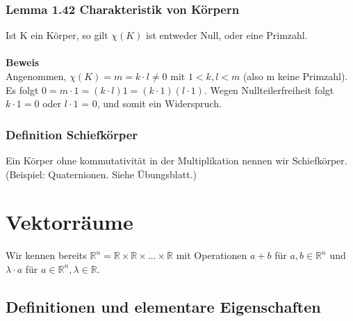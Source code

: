 \documentclass{report}
\newcommand{\lb}{\lambda}
\newcommand{\R}{\mathbb{R}}
\theoremstyle{customrem}
\theoremstyle{customdef}
\begin{document}
\subsubsection{Lemma 1.42 Charakteristik von Körpern}
Ist K ein Körper, so gilt $\chi(K)$ ist entweder  Null, oder eine Primzahl.\\
\\
\textbf{Beweis}\\
Angenommen, $\chi(K) = m = k \cdot l \neq 0$ mit  $1 < k, l < m$ (also m keine Primzahl). Es folgt  $0 = m \cdot 1 = (k \cdot l) 1 = (k \cdot 1)(l \cdot 1)$. Wegen Nullteilerfreiheit folgt $k \cdot 1 = 0$ oder $l \cdot 1$ = 0, und somit ein Widerspruch.

\subsubsection*{Definition Schiefkörper}
Ein Körper ohne kommutativität in der Multiplikation nennen wir Schiefkörper. (Beispiel: Quaternionen. Siehe Übungsblatt.)

\section{Vektorräume}
Wir kennen bereits  $\R^n = \R \times \R \times \dots \times \R$ mit Operationen $a + b$ für $a,b \in \R^n$ und $\lb \cdot a$ für $a \in \R^n, \lb \in \R$.

\subsection{Definitionen und elementare Eigenschaften}
\end{document}
